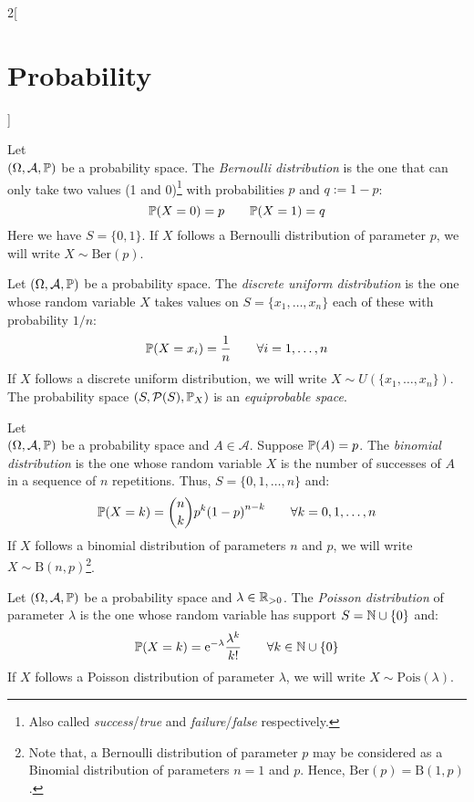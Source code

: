 \documentclass[../../../main.tex]{subfiles}
\begin{document}
\begin{multicols}{2}[\section{Probability}]
\begin{definition}
    \end{definition}
    \begin{definition}
        Let\\ $(\Omega,\mathcal{A},\mathbb{P})$ be a probability space. The \textit{Bernoulli distribution} is the one that can only take two values (1 and 0)\footnote{Also called \textit{success}/\textit{true} and \textit{failure}/\textit{false} respectively.} with probabilities $p$ and $q:=1-p$: $$\mathbb{P}(X=0)=p\qquad \mathbb{P}(X=1)=q$$ Here we have $S=\{0,1\}$. If $X$ follows a Bernoulli distribution of parameter $p$, we will write $X\sim \text{Ber}(p)$.
    \end{definition}
    \begin{definition}
        Let $(\Omega,\mathcal{A},\mathbb{P})$ be a probability space. The \textit{discrete uniform distribution} is the one whose random variable $X$ takes values on $S=\{x_1,\ldots,x_n\}$ each of these with probability $1/n$: $$\mathbb{P}(X=x_i)=\frac{1}{n}\qquad \forall i=1,\ldots,n$$ If $X$ follows a discrete uniform distribution, we will write $X\sim U(\{x_1,\ldots,x_n\})$. The probability space $(S,\mathcal{P}(S),\mathbb{P}_X)$ is an \textit{equiprobable space}.
    \end{definition}
    \begin{definition}
        Let\\ $(\Omega,\mathcal{A},\mathbb{P})$ be a probability space and $A\in\mathcal{A}$. Suppose $\mathbb{P}(A)=p$. The \textit{binomial distribution} is the one whose random variable $X$ is the number of successes of $A$ in a sequence of $n$ repetitions. Thus, $S=\{0,1,\ldots,n\}$ and: $$\mathbb{P}(X=k)=\binom{n}{k}p^k{(1-p)}^{n-k}\qquad \forall k=0,1,\ldots,n$$ If $X$ follows a binomial distribution of parameters $n$ and $p$, we will write $X\sim \text{B}(n,p)$\footnote{Note that, a Bernoulli distribution of parameter $p$ may be considered as a Binomial distribution of parameters $n=1$ and $p$. Hence, $\text{Ber}(p)=\text{B}(1,p)$.}.
    \end{definition}
    \begin{definition}
        Let $(\Omega,\mathcal{A},\mathbb{P})$ be a probability space and $\lambda\in\mathbb{R}_{>0}$. The \textit{Poisson distribution} of parameter $\lambda$ is the one whose random variable has support $S=\mathbb{N}\cup\{0\}$ and: $$\mathbb{P}(X=k)=\mathrm{e}^{-\lambda}\frac{\lambda^k}{k!}\qquad \forall k\in\mathbb{N}\cup\{0\}$$ If $X$ follows a Poisson distribution of parameter $\lambda$, we will write $X\sim \text{Pois}(\lambda)$.

\end{definition}
\end{multicols}
\end{document}
